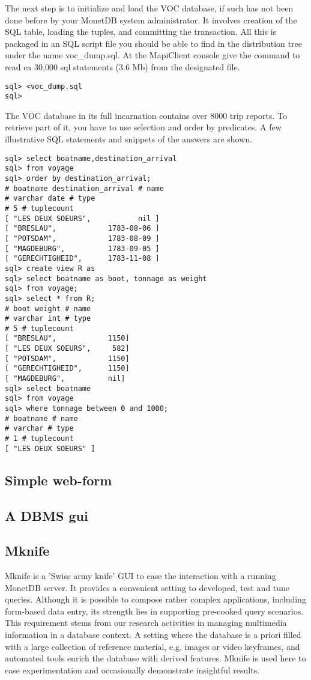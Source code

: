 \documentclass[10pt,twocolumn,fleqn]{article}
\begin{document}
The next step is to initialize and load the VOC database, if such has
not been done before by your MonetDB system administrator. It involves
creation of the SQL table, loading the tuples, and committing the
transaction. All this is packaged in an SQL script file you should
be able to find in the distribution tree under the name voc\_dump.sql.
At the MapiClient console give the command to read ca 30,000
sql statements  (3.6 Mb) from the designated file.

\begin{verbatim}
sql> <voc_dump.sql
sql>
\end{verbatim}

The VOC database in its full incarnation contains over 8000
trip reports. To retrieve part of it, you have to use selection and order
by predicates. A few illustrative SQL statements and snippets of
the answers are shown.
{\footnotesize
\begin{verbatim}
sql> select boatname,destination_arrival 
sql> from voyage 
sql> order by destination_arrival;
# boatname destination_arrival # name
# varchar date # type
# 5 # tuplecount
[ "LES DEUX SOEURS",           nil ]
[ "BRESLAU",            1783-08-06 ]
[ "POTSDAM",            1783-08-09 ]
[ "MAGDEBURG",          1783-09-05 ]
[ "GERECHTIGHEID",      1783-11-08 ]
sql> create view R as 
sql> select boatname as boot, tonnage as weight 
sql> from voyage;
sql> select * from R;
# boot weight # name
# varchar int # type
# 5 # tuplecount
[ "BRESLAU",            1150]
[ "LES DEUX SOEURS",     582]
[ "POTSDAM",            1150]
[ "GERECHTIGHEID",      1150]
[ "MAGDEBURG",          nil]
sql> select boatname 
sql> from voyage
sql> where tonnage between 0 and 1000;
# boatname # name
# varchar # type
# 1 # tuplecount
[ "LES DEUX SOEURS" ]
\end{verbatim}
}

\subsection{Simple web-form}
\label{form}
\subsection{A DBMS gui}
\label{ide}
\subsection{Mknife}
\label{mknife}
Mknife is a 'Swiss army knife' GUI to ease the interaction with a running 
MonetDB server. It provides a convenient setting to developed, test and 
tune queries. Although it is possible to compose rather complex applications,
including form-based data entry, its strength lies in supporting pre-cooked 
query scenarios. This requirement stems from our research activities in managing 
multimedia information in a database context. A setting where the database 
is a priori filled with a large collection of reference material, 
e.g. images or video keyframes, and automated tools enrich the database 
with derived features. Mknife is used here to ease experimentation and 
occasionally demonstrate insightful results.
\end{document}
